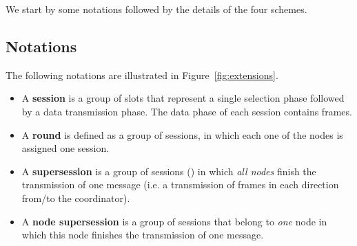 \documentclass[10pt,letterpaper,conference]{IEEEtran}
\begin{document}
We start by some notations followed by the details of the four schemes.

\subsection{Notations}
The following notations are illustrated in Figure~\ref{fig:extensions}.
\begin{itemize}
  \item A \textbf{session} is a group of slots that represent a single selection
phase followed by a data transmission phase. The data phase of each session
contains  frames.

  \item A \textbf{round} is defined as a group of  sessions, in which each one of the  nodes is
assigned one session.

  \item A \textbf{supersession} is a group of sessions () in which \emph{all nodes}
finish the transmission of one message (i.e. a transmission of  frames in each direction from/to the coordinator).

  \item A \textbf{node supersession} is a group of  sessions that belong to \emph{one}
node in which this node finishes the transmission of one message.

\end{itemize}

\begin{figure*}[!t]
\centering
{}
\caption{Four different schemes for two-way communication. The direction selection phase between the selection and data transmission phase is not shown for clarity. Different colors represent different nodes while different hashing pattern represent the from/to slots.}
\label{fig:extensions}
\end{figure*}
\end{document}
